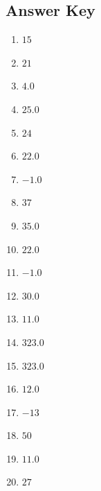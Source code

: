 \documentclass{article}
\begin{document}
\newpage

\subsection*{Answer Key}

\begin{enumerate}
\item $\displaystyle 15 $ \ 
\item $\displaystyle 21 $ \ 
\item $\displaystyle 4.0 $ \ 
\item $\displaystyle 25.0 $ \ 
\item $\displaystyle 24 $ \ 
\item $\displaystyle 22.0 $ \ 
\item $\displaystyle -1.0 $ \ 
\item $\displaystyle 37 $ \ 
\item $\displaystyle 35.0 $ \ 
\item $\displaystyle 22.0 $ \ 
\item $\displaystyle -1.0 $ \ 
\item $\displaystyle 30.0 $ \ 
\item $\displaystyle 11.0 $ \ 
\item $\displaystyle 323.0 $ \ 
\item $\displaystyle 323.0 $ \ 
\item $\displaystyle 12.0 $ \ 
\item $\displaystyle -13 $ \ 
\item $\displaystyle 50 $ \ 
\item $\displaystyle 11.0 $ \ 
\item $\displaystyle 27 $ \ 

\end{enumerate}
\end{document}
